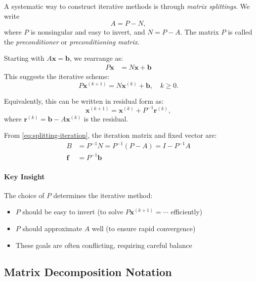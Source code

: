 A systematic way to construct iterative methods is through \emph{matrix splittings}. We write
\begin{equation}
    A = P - N,
    \label{eq:matrix-splitting}
\end{equation}
where $P$ is nonsingular and easy to invert, and $N = P - A$. The matrix $P$ is called the \emph{preconditioner} or \emph{preconditioning matrix}.

Starting with $A\mathbf{x} = \mathbf{b}$, we rearrange as:
\begin{align}
    P\mathbf{x} &= N\mathbf{x} + \mathbf{b}
\end{align}
This suggests the iterative scheme:
\begin{equation}
    P\mathbf{x}^{(k+1)} = N\mathbf{x}^{(k)} + \mathbf{b}, \quad k \geq 0.
    \label{eq:splitting-iteration}
\end{equation}

Equivalently, this can be written in residual form as:
\begin{equation}
    \mathbf{x}^{(k+1)} = \mathbf{x}^{(k)} + P^{-1}\mathbf{r}^{(k)},
    \label{eq:residual-correction}
\end{equation}
where $\mathbf{r}^{(k)} = \mathbf{b} - A\mathbf{x}^{(k)}$ is the residual.

From \eqref{eq:splitting-iteration}, the iteration matrix and fixed vector are:
\begin{align}
    B &= P^{-1}N = P^{-1}(P - A) = I - P^{-1}A \\
    \mathbf{f} &= P^{-1}\mathbf{b}
\end{align}

\paragraph{Key Insight}
The choice of $P$ determines the iterative method:
\begin{itemize}
    \item $P$ should be easy to invert (to solve $P\mathbf{x}^{(k+1)} = \cdots$ efficiently)
    \item $P$ should approximate $A$ well (to ensure rapid convergence)
    \item These goals are often conflicting, requiring careful balance
\end{itemize}

\subsection{Matrix Decomposition Notation}

